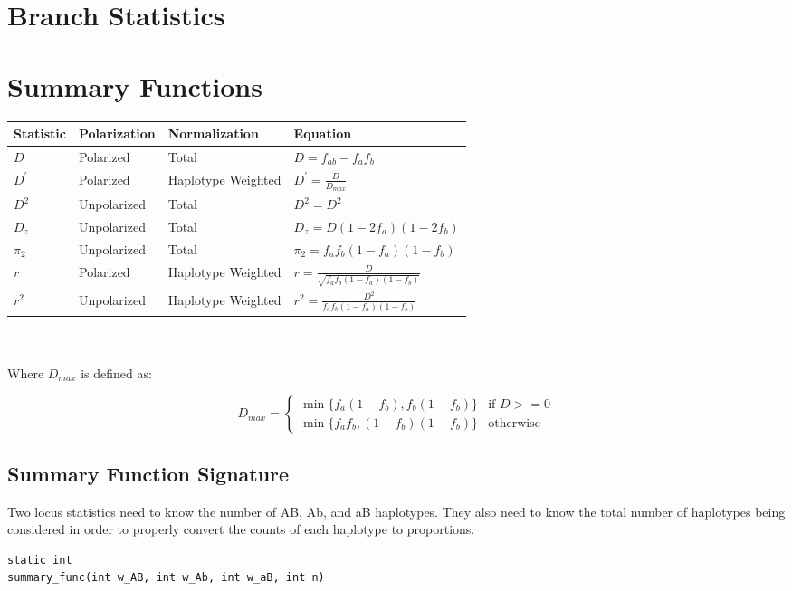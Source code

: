 \documentclass[12pt]{article}
\begin{document}
\section{Branch Statistics}

\section{Summary Functions}

\begin{tabular}{llll} Statistic & Polarization & Normalization & Equation\\

\hline $D$ & Polarized & Total & $D = f_{ab} - f_{a}f_{b}$ \\

$D^{\prime}$ &
Polarized & Haplotype Weighted & $D^{\prime} = \frac{D}{D_{max}}$ \\

$D^{2}$ &
Unpolarized & Total & $D^{2} = D^{2}$ \\

$D_{z}$ & Unpolarized & Total & $D_{z}
= D (1 - 2 f_{a})(1-2f_{b})$ \\

$\pi_{2}$ & Unpolarized & Total & $\pi_{2} =
f_{a}f_{b}(1-f_{a})(1-f_{b})$ \\

$r$ & Polarized & Haplotype Weighted & $r =
\frac{D}{\sqrt{f_{a}f_{b}(1-f_{a})(1-f_{b})}}$ \\

$r^{2}$ & Unpolarized &
Haplotype Weighted & $r^{2} = \frac{D^{2}}{f_{a}f_{b}(1-f_{a})(1-f_{b})}$ \\
\end{tabular}
\\ 
\\
Where $D_{max}$ is defined as:

\[
  D_{max} = 
  \begin{cases}
    \min\{f_{a}(1-f_{b}),f_{b}(1-f_{b})\} & \text{if~}D>=0 \\
    \min\{f_{a}f_{b},(1-f_{b})(1-f_{b})\} & \text{otherwise}
  \end{cases}
\]

\subsection{Summary Function Signature}
Two locus statistics need to know the number of AB, Ab, and aB haplotypes. They
also need to know the total number of haplotypes being considered in order to
properly convert the counts of each haplotype to proportions.
\begin{verbatim}
static int
summary_func(int w_AB, int w_Ab, int w_aB, int n)
\end{verbatim}
\end{document}
